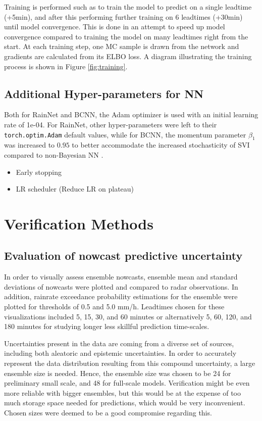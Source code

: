 Training is performed such as to train the model to predict on a single leadtime (+5min), and after this performing further training on 6 leadtimes (+30min) until model convergence. This is done in an attempt to speed up model convergence compared to training the model on many leadtimes right from the start. At each training step, one MC sample is drawn from the network and gradients are calculated from its ELBO loss. A diagram illustrating the training process is shown in Figure \ref{fig:training}.

\subsection{Additional Hyper-parameters for NN}
\label{section:hyper}
 Both for RainNet and BCNN, the Adam optimizer is used with an initial learning rate of 1e-04. For RainNet, other hyper-parameters were left to their \texttt{torch.optim.Adam} default values, while for BCNN, the momentum parameter $\beta_1$ was increased to $0.95$ to better accommodate the increased stochasticity of SVI compared to non-Bayesian NN \cite{noauthor_svi_nodate}. 
 
 
 \begin{itemize}
 	\item Early stopping
	\item LR scheduler (Reduce LR on plateau)
 \end{itemize}


\section{Verification Methods}


\subsection{Evaluation of nowcast predictive uncertainty}


In order to visually assess ensemble nowcasts, ensemble mean and standard deviations of nowcasts were plotted and compared to radar observations. In addition, rainrate exceedance probability estimations for the ensemble were plotted for thresholds of 0.5 and 5.0 mm/h. Leadtimes chosen for these visualizations included 5, 15, 30, and 60 minutes or alternatively 5, 60, 120, and 180 minutes for studying longer less skillful prediction time-scales.

Uncertainties present in the data are coming from a diverse set of sources, including both aleatoric and epistemic uncertainties. In order to accurately represent the data distribution resulting from this compound uncertainty, a large ensemble size is needed. Hence, the ensemble size was chosen to be 24 for preliminary small scale, and 48 for full-scale models. Verification might be even more reliable with bigger ensembles, but this would be at the expense of too much storage space needed for predictions, which would be very inconvenient. Chosen sizes were deemed to be a good compromise regarding this.



